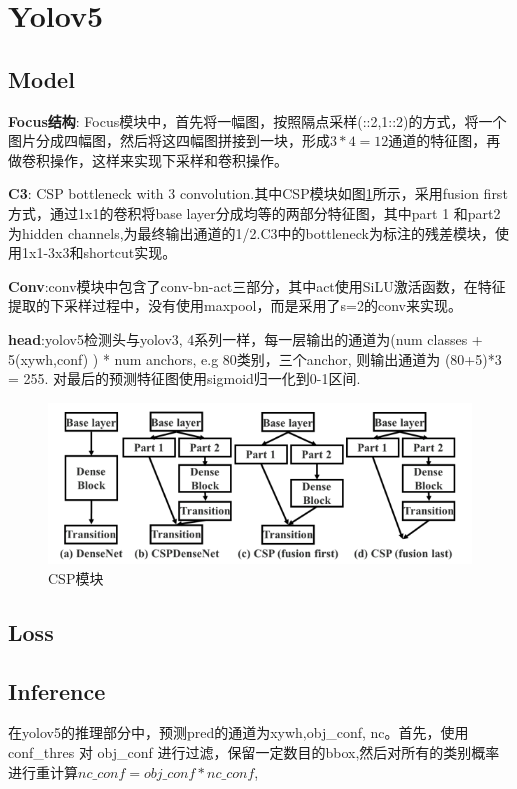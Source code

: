 \documentclass{article}
\begin{document}
\section{Yolov5}
\subsection{Model}
\textbf{Focus结构}: Focus模块中，首先将一幅图，按照隔点采样(::2,1::2)的方式，将一个图片分成四幅图，然后将这四幅图拼接到一块，形成$3*4=12$通道的特征图，再做卷积操作，这样来实现下采样和卷积操作。

\textbf{C3}: CSP bottleneck with 3 convolution\cite{wang2020cspnet}.其中CSP模块如图\ref{Fig.csp}所示，采用fusion first方式，通过1x1的卷积将base layer分成均等的两部分特征图，其中part 1 和part2为hidden channels,为最终输出通道的1/2.C3中的bottleneck为标注的残差模块，使用1x1-3x3和shortcut实现。

\textbf{Conv}:conv模块中包含了conv-bn-act三部分，其中act使用SiLU激活函数，在特征提取的下采样过程中，没有使用maxpool，而是采用了s=2的conv来实现。

\textbf{head}:yolov5检测头与yolov3, 4系列一样，每一层输出的通道为(num classes + 5(xywh,conf) ) * num anchors, e.g 80类别，三个anchor, 则输出通道为 (80+5)*3 = 255. 对最后的预测特征图使用sigmoid归一化到0-1区间.

\begin{figure}[htp!]
\centering
\includegraphics[scale=0.6]{images/csp_block.png}
\caption{CSP模块}
\label{Fig.csp}
\end{figure}

\subsection{Loss}

\subsection{Inference}
在yolov5的推理部分中，预测pred的通道为xywh,obj\_conf, nc。首先，使用conf\_thres 对 obj\_conf 进行过滤，保留一定数目的bbox,然后对所有的类别概率进行重计算$nc\_conf = obj\_conf * nc\_conf$,
\end{document}
